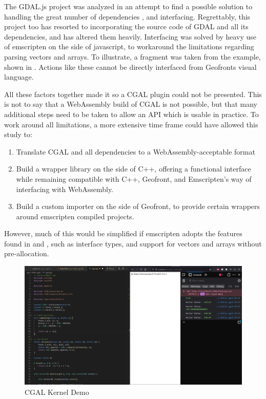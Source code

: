 The GDAL.js project was analyzed in an attempt to find a possible solution to handling the great number of dependencies \citep*{dohler_gdal_2022}, and interfacing. 
Regrettably, this project too has resorted to incorporating the source code of GDAL and all its dependencies, and has altered them heavily. 
Interfacing was solved by heavy use of emscripten on the side of javascript, to workaround the limitations regarding parsing vectors and arrays. 
To illustrate, a fragment was taken from the  example, shown in .
Actions like these cannot be directly interfaced from Geofronts visual language.

All these factors together made it so a CGAL plugin could not be presented.
This is not to say that a WebAssembly build of CGAL is not possible, but that many additional steps need to be taken to allow an API which is usable in practice. 
To work around all limitations, a more extensive time frame could have allowed this study to:
\begin{enumerate}
\item Translate CGAL and all dependencies to a WebAssembly-acceptable format 
\item Build a wrapper library on the side of C++, offering a functional interface while remaining compatible with C++, Geofront, and Emscripten's way of interfacing with WebAssembly.  
\item Build a custom importer on the side of Geofront, to provide certain wrappers around emscripten compiled projects.
\end{enumerate}
However, much of this would be simplified if emscripten adopts the features found in  and , such as interface types, and support for vectors and arrays without pre-allocation. 

\begin{figure}
  \graphicspath{{../../assets/images/6.1.4/}}
  \centering
  \includegraphics[width=\linewidth]{demo-2.PNG}
  \caption[loading a plugin]{CGAL Kernel Demo}
  \label{fig:cgal-tryout-2}
\end{figure}

